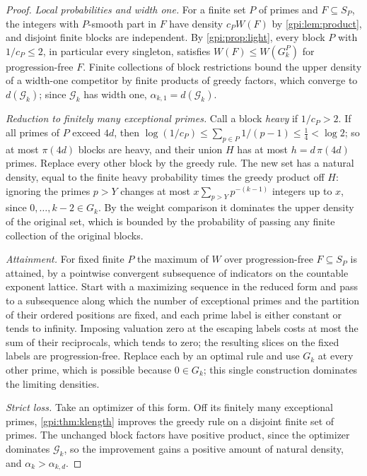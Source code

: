 \begin{proof}
\emph{Local probabilities and width one.} For a finite set $P$ of primes and $F\subseteq S_P$, the
integers with $P$-smooth part in $F$ have density $c_PW(F)$ by \cref{gpi:lem:product}, and disjoint
finite blocks are independent. By \cref{gpi:prop:light}, every block $P$ with $1/c_P\le2$, in
particular every singleton, satisfies $W(F)\le W(G_k^P)$ for progression-free $F$. Finite collections
of block restrictions bound the upper density of a width-one competitor by finite products of greedy
factors, which converge to $d(\mathcal G_k)$; since $\mathcal G_k$ has width one,
$\alpha_{k,1}=d(\mathcal G_k)$.

\emph{Reduction to finitely many exceptional primes.} Call a block \emph{heavy} if $1/c_P>2$. If all
primes of $P$ exceed $4d$, then $\log(1/c_P)\le\sum_{p\in P}1/(p-1)\le\tfrac14<\log2$; so at most
$\pi(4d)$ blocks are heavy, and their union $H$ has at most $h=d\,\pi(4d)$ primes. Replace every
other block by the greedy rule. The new set has a natural density, equal to the finite heavy
probability times the greedy product off $H$: ignoring the primes $p>Y$ changes at most
$x\sum_{p>Y}p^{-(k-1)}$ integers up to $x$, since $0,\dots,k-2\in G_k$. By the weight comparison it
dominates the upper density of the original set, which is bounded by the probability of passing any
finite collection of the original blocks.

\emph{Attainment.} For fixed finite $P$ the maximum of $W$ over progression-free $F\subseteq S_P$ is
attained, by a pointwise convergent subsequence of indicators on the countable exponent lattice.
Start with a maximizing sequence in the reduced form and pass to a subsequence along which the
number of exceptional primes and the partition of their ordered positions are fixed, and each prime
label is either constant or tends to infinity. Imposing valuation zero at the escaping labels costs
at most the sum of their reciprocals, which tends to zero; the resulting slices on the fixed labels
are progression-free. Replace each by an optimal rule and use $G_k$ at every other prime, which is
possible because $0\in G_k$; this single construction dominates the limiting densities.

\emph{Strict loss.} Take an optimizer of this form. Off its finitely many exceptional primes,
\cref{gpi:thm:klength} improves the greedy rule on a disjoint finite set of primes. The unchanged
block factors have positive product, since the optimizer dominates $\mathcal G_k$, so the
improvement gains a positive amount of natural density, and $\alpha_k>\alpha_{k,d}$.


\end{proof}
